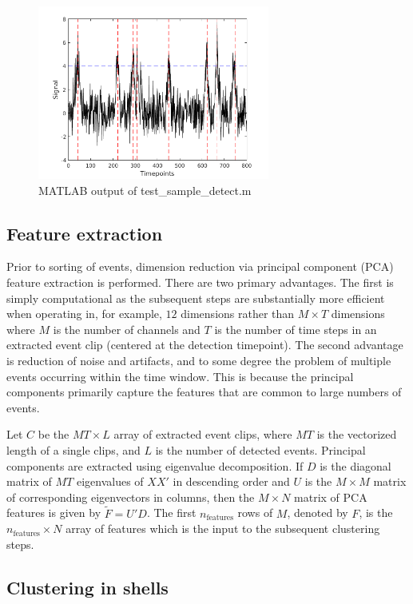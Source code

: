 \documentclass{article}
\begin{document}
\begin{figure}[h]
\caption{MATLAB output of test\_sample\_detect.m}
\includegraphics[width=3in]{test_sample_detect.png}
\end{figure}

\subsection{Feature extraction}

Prior to sorting of events, dimension reduction via principal component (PCA) feature extraction is performed. There are two primary advantages. The first is simply computational as the subsequent steps are substantially more efficient when operating in, for example, $12$ dimensions rather than $M\times T$ dimensions where $M$ is the number of channels and $T$ is the number of time steps in an extracted event clip (centered at the detection timepoint). The second advantage is reduction of noise and artifacts, and to some degree the problem of multiple events occurring within the time window. This is because the principal components primarily capture the features that are common to large numbers of events.

Let $C$ be the $MT \times L$ array of extracted event clips, where $MT$ is the vectorized length of a single clips, and $L$ is the number of detected events. Principal components are extracted using eigenvalue decomposition. If $D$ is the diagonal matrix of $MT$ eigenvalues of $XX'$ in descending order and $U$ is the $M\times M$ matrix of corresponding eigenvectors in columns, then the $M\times N$ matrix of PCA features is given by $\tilde{F}=U'D$. The first $n_{\text{features}}$ rows of $M$, denoted by $F$, is the $n_{\text{features}}\times N$ array of features which is the input to the subsequent clustering steps.

\subsection{Clustering in shells}
\end{document}
